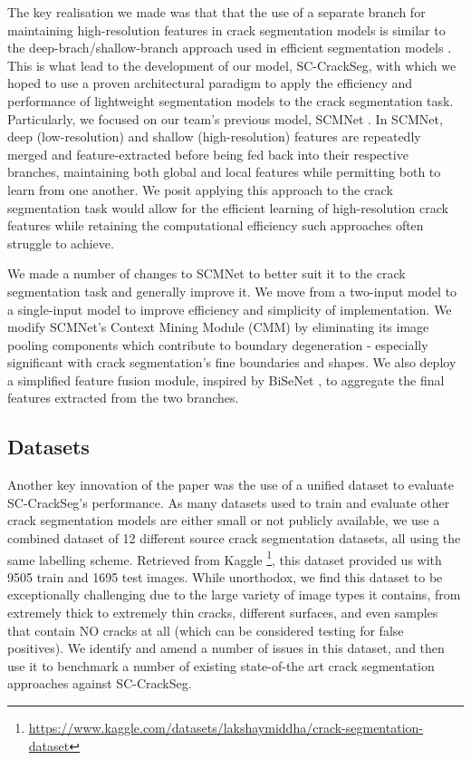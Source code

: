 \documentclass[a4paper,12pt]{report}
\begin{document}
The key realisation we made was that that the use of a separate branch for maintaining high-resolution features in crack segmentation models \cite{nayyeri_multi-resolution_2021} is similar to the deep-brach/shallow-branch approach used in efficient segmentation models \cite{yu_bisenet_2018} \cite{poudel_contextnet_2018}. This is what lead to the development of our model, SC-CrackSeg, with which we hoped to use a proven architectural paradigm to apply the efficiency and performance of lightweight segmentation models to the crack segmentation task. Particularly, we focused on our team's previous model, SCMNet \cite{singha_scmnet_2021}. In SCMNet, deep (low-resolution) and shallow (high-resolution) features are repeatedly merged and feature-extracted before being fed back into their respective branches, maintaining both global and local features while permitting both to learn from one another. We posit applying this approach to the crack segmentation task would allow for the efficient learning of high-resolution crack features while retaining the computational efficiency such approaches often struggle to achieve.

We made a number of changes to SCMNet to better suit it to the crack segmentation task and generally improve it. We move from a two-input model to a single-input model to improve efficiency and simplicity of implementation. We modify SCMNet's Context Mining Module (CMM) by eliminating its image pooling components which contribute to boundary degeneration - especially significant with crack segmentation's fine boundaries and shapes. We also deploy a simplified feature fusion module, inspired by BiSeNet \cite{yu_bisenet_2018}, to aggregate the final features extracted from the two branches. %

\subsection{Datasets}
Another key innovation of the paper was the use of a unified dataset to evaluate SC-CrackSeg's performance. As many datasets used to train and evaluate other crack segmentation models are either small or not publicly available, we use a combined dataset of 12 different source crack segmentation datasets, all using the same labelling scheme. Retrieved from Kaggle \footnote{\url{https://www.kaggle.com/datasets/lakshaymiddha/crack-segmentation-dataset}}, this dataset provided us with 9505 train and 1695 test images. While unorthodox, we find this dataset to be exceptionally challenging due to the large variety of image types it contains, from extremely thick to extremely thin cracks, different surfaces, and even samples that contain NO cracks at all (which can be considered testing for false positives). We identify and amend a number of issues in this dataset, and then use it to benchmark a number of existing state-of-the art crack segmentation approaches against SC-CrackSeg.
\end{document}

